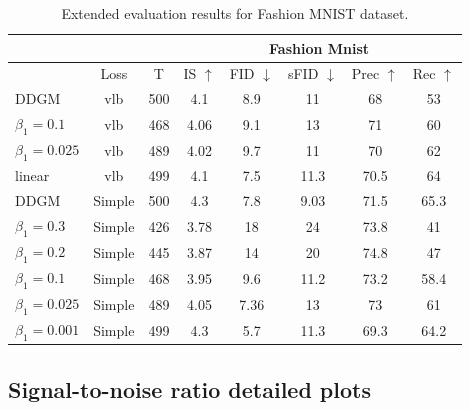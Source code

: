 \begin{table}[h!]
  \centering
  \caption{Extended evaluation results for Fashion MNIST dataset.
}
  \label{tab:extended_results_mnist}
  \begin{tabular}{l||c|c|ccccc}
    \toprule
     & & & \multicolumn{5}{c}{Fashion Mnist}  \\
    \midrule
     &Loss& T &IS  $\uparrow$&FID $\downarrow$& sFID $\downarrow$&Prec $\uparrow$&Rec $\uparrow$\\

    \midrule
    DDGM &vlb& 500 &4.1& 8.9 &11&68 & 53 \\
    \ours{} $\beta_1=0.1$ &vlb& 468 & 4.06& 9.1 &13&71 & 60 \\
    \ours{} $\beta_1=0.025$ &vlb& 489  & 4.02&9.7&11&70&62\\
    \ours{} linear &vlb & 499 & 4.1 &7.5 & 11.3 &70.5 & 64 \\
    \midrule
    DDGM &Simple & 500 &4.3  & 7.8 & 9.03 &71.5 & 65.3\\
    \ours{} $\beta_1=0.3$ &Simple& 426 & 3.78& 18 &24 & 73.8 & 41\\
    \ours{} $\beta_1=0.2$ &Simple& 445 & 3.87& 14 &20 & 74.8 & 47\\
    \ours{} $\beta_1=0.1$ &Simple& 468 &3.95& 9.6 &11.2& 73.2 & 58.4\\
    \ours{} $\beta_1=0.025$ &Simple& 489 & 4.05& 7.36&13 & 73 & 61\\
    \ours{} $\beta_1=0.001$&Simple & 499 &4.3& 5.7 &11.3 & 69.3 & 64.2\\

    \bottomrule
  \end{tabular}
\vspace*{2\baselineskip}
\end{table}

\newpage
\subsection{Signal-to-noise ratio detailed plots}\label{appx:full_snr}

